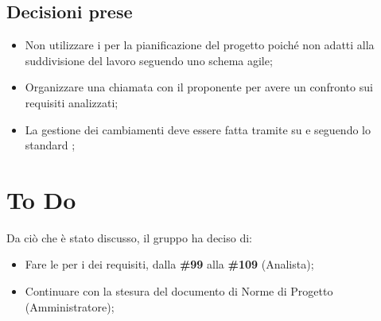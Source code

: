 \documentclass[a4paper, 12pt]{article}
\begin{document}
\subsection{Decisioni prese}
\begin{itemize}
    \item Non utilizzare i  per la pianificazione del progetto poiché non adatti alla suddivisione del lavoro seguendo uno schema agile;
    \item Organizzare una chiamata con il proponente per avere un confronto sui requisiti analizzati;
    \item La gestione dei cambiamenti deve essere fatta tramite  su  e seguendo lo standard ;
\end{itemize}

\section{To Do}
Da ciò che è stato discusso, il gruppo ha deciso di:
\begin{itemize}
    \item Fare le  per i  dei requisiti, dalla \textbf{\#99} alla \textbf{\#109} (Analista);
    \item Continuare con la stesura del documento di Norme di Progetto (Amministratore);
\end{itemize}
\end{document}
